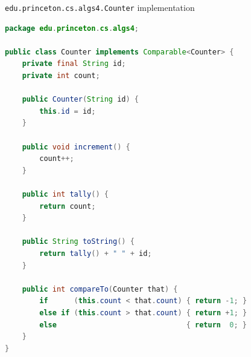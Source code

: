 \documentclass[8pt,a4paper,compress]{beamer}
\begin{document}
\begin{frame}[fragile]
\pause

\lstinline{edu.princeton.cs.algs4.Counter} implementation
\begin{lstlisting}[language=Java]
package edu.princeton.cs.algs4;

public class Counter implements Comparable<Counter> {
    private final String id;
    private int count;

    public Counter(String id) { 
        this.id = id; 
    }

    public void increment() { 
        count++; 
    }

    public int tally() { 
        return count; 
    }

    public String toString() { 
        return tally() + " " + id; 
    }
    
    public int compareTo(Counter that) {
        if      (this.count < that.count) { return -1; }
        else if (this.count > that.count) { return +1; }
        else                              { return  0; }
    }
}
\end{lstlisting}
\end{frame}
\end{document}
